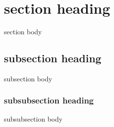 \documentclass{article}
\begin{document}
\section{section heading}
section body

\subsection{subsection heading}
subsection body

\subsubsection{subsubsection heading}
subsubsection body
\end{document}
